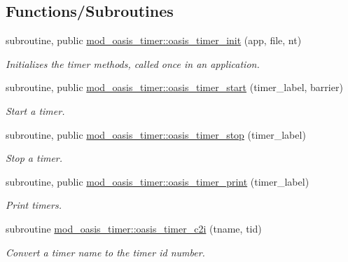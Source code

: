 \subsection*{Functions/\+Subroutines}
\begin{DoxyCompactItemize}
\item 
subroutine, public \hyperlink{namespacemod__oasis__timer_a44a1bb64d1d892a9710d8c94d0ed0e3a}{mod\+\_\+oasis\+\_\+timer\+::oasis\+\_\+timer\+\_\+init} (app, file, nt)
\begin{DoxyCompactList}\small\item\em Initializes the timer methods, called once in an application. \end{DoxyCompactList}\item 
subroutine, public \hyperlink{namespacemod__oasis__timer_a13a16c07778911b45f3f42a542348019}{mod\+\_\+oasis\+\_\+timer\+::oasis\+\_\+timer\+\_\+start} (timer\+\_\+label, barrier)
\begin{DoxyCompactList}\small\item\em Start a timer. \end{DoxyCompactList}\item 
subroutine, public \hyperlink{namespacemod__oasis__timer_a01a76142a72cc6bc845736e79ad99bd3}{mod\+\_\+oasis\+\_\+timer\+::oasis\+\_\+timer\+\_\+stop} (timer\+\_\+label)
\begin{DoxyCompactList}\small\item\em Stop a timer. \end{DoxyCompactList}\item 
subroutine, public \hyperlink{namespacemod__oasis__timer_a3071ad54f61d88f16ad98ad7c0303915}{mod\+\_\+oasis\+\_\+timer\+::oasis\+\_\+timer\+\_\+print} (timer\+\_\+label)
\begin{DoxyCompactList}\small\item\em Print timers. \end{DoxyCompactList}\item 
subroutine \hyperlink{namespacemod__oasis__timer_a23df8ae4894ac3fde178fe17292b317b}{mod\+\_\+oasis\+\_\+timer\+::oasis\+\_\+timer\+\_\+c2i} (tname, tid)
\begin{DoxyCompactList}\small\item\em Convert a timer name to the timer id number. \end{DoxyCompactList}\end{DoxyCompactItemize}
